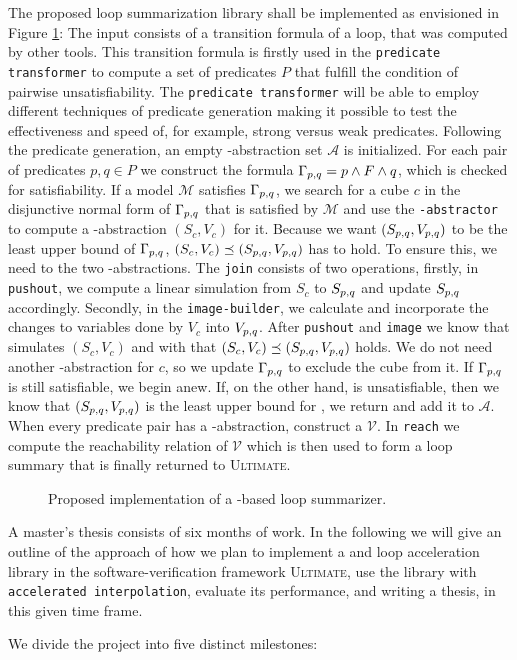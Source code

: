 
The proposed \qvasrs loop summarization library shall be implemented as envisioned in Figure \ref{fig}: The input consists of a transition formula of a loop, that was computed by other tools. This transition formula is firstly used in the \texttt{predicate transformer} to compute a set of predicates $P$ that fulfill the condition of pairwise unsatisfiability. The \texttt{predicate transformer} will be able to employ different techniques of predicate generation making it possible to test the effectiveness and speed of, for example, strong versus weak predicates. Following the predicate generation, an empty \qvasr-abstraction set $\mathcal{A}$ is initialized. For each pair of predicates $p, q \in P$ we construct the formula $\Gamma_{p, q} = p \land F \land q$, which is checked for satisfiability. If a model $\mathcal{M}$ satisfies $\Gamma_{p, q}$, we search for a cube $c$ in the disjunctive normal form of $\Gamma_{p, q}$ that is satisfied by $\mathcal{M}$ and use the \texttt{\qvasr-abstractor} to compute a \qvasr-abstraction $(S_c, V_c)$ for it. Because we want $(S_{p, q}, V_{p, q})$ to be the least upper bound of $\Gamma_{p, q}$, $(S_c, V_c) \preceq (S_{p, q}, V_{p, q})$ has to hold. To ensure this, we need to  the two \qvasr-abstractions. The \texttt{join} consists of two operations, firstly, in \texttt{pushout}, we compute a linear simulation from $S_c$ to $S_{p, q}$ and update $S_{p, q}$ accordingly. Secondly, in the \texttt{image-builder}, we calculate and incorporate the changes to variables done by $V_c$ into $V_{p, q}$. After \texttt{pushout} and \texttt{image} we know that \pqvasr simulates $(S_c, V_c)$ and with that $(S_c, V_c) \preceq (S_{p, q}, V_{p, q})$ holds. We do not need another \qvasr-abstraction for $c$, so we update $\Gamma_{p, q}$ to exclude the cube from it. If $\Gamma_{p, q}$ is still satisfiable, we begin anew.
If, on the other hand, \pqformula is unsatisfiable, then we know that $(S_{p, q}, V_{p, q})$ is the least upper bound for \pqformula, we return and add it to $\mathcal{A}$. When every predicate pair has a \qvasr-abstraction, construct a \qvasrs $\mathcal{V}$. In \texttt{reach} we compute the reachability relation of $\mathcal{V}$ which is then used to form a loop summary that is finally returned to \textsc{Ultimate}.
\begin{figure}[H]
    
    \caption{Proposed implementation of a \qvasrs-based loop summarizer.}
    \label{fig}
\end{figure}

A master's thesis consists of six months of work. In the following we will give an outline of the approach of how we plan to implement a \qvasr and \qvasrs loop acceleration library in the software-verification framework \textsc{Ultimate}, use the library with \texttt{accelerated interpolation}, evaluate its performance, and writing a thesis, in this given time frame. \\ \par
We divide the project into five distinct milestones:

